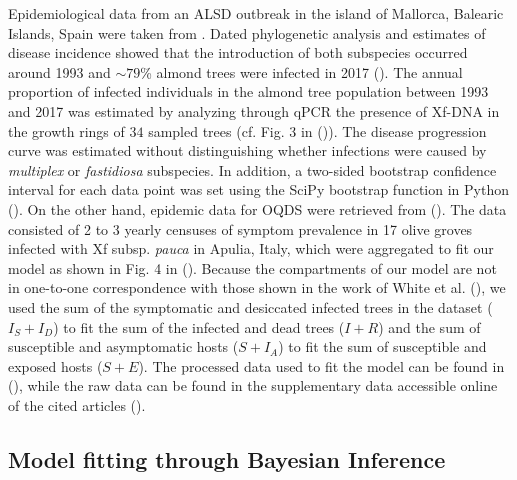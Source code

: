 Epidemiological data from an ALSD outbreak in the island of Mallorca,
Balearic Islands, Spain were taken from \cite{Moralejo2020}. Dated phylogenetic
analysis and estimates of disease incidence showed that the introduction of
both subspecies occurred around 1993 and $\sim 79$\% almond trees were infected
in 2017 (\cite{Moralejo2020}). The annual proportion of infected individuals in
the almond tree population between 1993 and 2017 was estimated by analyzing
through qPCR the presence of Xf-DNA in the growth rings of $34$ sampled trees
(cf. Fig. 3 in (\cite{Moralejo2020})). The disease progression curve was
estimated without distinguishing whether infections were caused by
\textit{multiplex} or \textit{fastidiosa} subspecies. In addition, a two-sided
bootstrap confidence interval for each data point was set using the SciPy
bootstrap function in Python (\cite{SciPy}). On the other hand, epidemic data
for OQDS were retrieved from (\cite{White2020}). The data consisted of 2 to 3
yearly censuses of symptom prevalence in 17 olive groves infected with Xf
subsp. \textit{pauca} in Apulia, Italy, which were aggregated to fit our model
as shown in Fig. 4 in (\cite{White2020}). Because the compartments of our model
are not in one-to-one correspondence with those shown in the work of White et
al. (\cite{White2020}), we used the sum of the symptomatic and desiccated
infected trees in the dataset ($I_S+I_D$) to fit the sum of the infected and
dead trees ($I+R$) and the sum of susceptible and asymptomatic hosts ($S+I_A$)
to fit the sum of susceptible and exposed hosts ($S+E$). The processed data
used to fit the model can be found in (\cite{CODE}), while the raw data can be
found in the supplementary data accessible online of the cited articles
(\cite{Moralejo2020,White2020}).

\subsection{Model fitting through Bayesian Inference}

